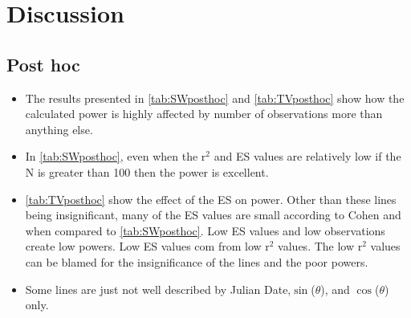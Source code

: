 \section{Discussion}

\subsection{Post hoc}
\begin{itemize}
	\item The results presented in \autoref{tab:SWposthoc} and \autoref{tab:TVposthoc} show how the calculated power is highly affected by number of observations more than anything else.
	\item In \autoref{tab:SWposthoc}, even when the r$^2$ and ES values are relatively low if the N is greater than 100 then the power is excellent.
	\item \autoref{tab:TVposthoc} show the effect of the ES on power.  Other than these lines being insignificant, many of the ES values are small according to Cohen and when compared to \autoref{tab:SWposthoc}.  Low ES values and low observations create low powers.  Low ES values com from low r$^2$ values.  The low r$^2$ values can be blamed for the insignificance of the lines and the poor powers. 
	\item Some lines are just not well described by Julian Date,$\sin$($\theta$), and $\cos$($\theta$) only.
\end{itemize}

